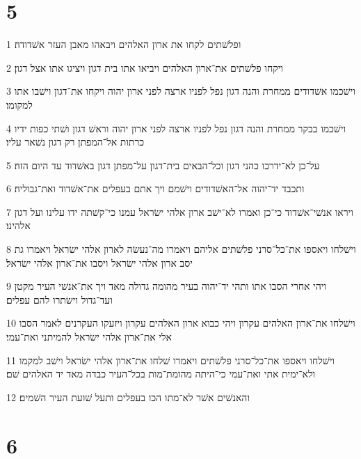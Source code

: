 \chapter{5}

\par 1 ופלשׁתים לקחו את ארון האלהים ויבאהו מאבן העזר אשׁדודה׃
\par 2 ויקחו פלשׁתים את־ארון האלהים ויביאו אתו בית דגון ויציגו אתו אצל דגון׃
\par 3 וישׁכמו אשׁדודים ממחרת והנה דגון נפל לפניו ארצה לפני ארון יהוה ויקחו את־דגון וישׁבו אתו למקומו׃
\par 4 וישׁכמו בבקר ממחרת והנה דגון נפל לפניו ארצה לפני ארון יהוה וראשׁ דגון ושׁתי כפות ידיו כרתות אל־המפתן רק דגון נשׁאר עליו׃
\par 5 על־כן לא־ידרכו כהני דגון וכל־הבאים בית־דגון על־מפתן דגון באשׁדוד עד היום הזה׃
\par 6 ותכבד יד־יהוה אל־האשׁדודים וישׁמם ויך אתם בעפלים את־אשׁדוד ואת־גבוליה׃
\par 7 ויראו אנשׁי־אשׁדוד כי־כן ואמרו לא־ישׁב ארון אלהי ישׂראל עמנו כי־קשׁתה ידו עלינו ועל דגון אלהינו׃
\par 8 וישׁלחו ויאספו את־כל־סרני פלשׁתים אליהם ויאמרו מה־נעשׂה לארון אלהי ישׂראל ויאמרו גת יסב ארון אלהי ישׂראל ויסבו את־ארון אלהי ישׂראל׃
\par 9 ויהי אחרי הסבו אתו ותהי יד־יהוה בעיר מהומה גדולה מאד ויך את־אנשׁי העיר מקטן ועד־גדול וישׂתרו להם עפלים׃
\par 10 וישׁלחו את־ארון האלהים עקרון ויהי כבוא ארון האלהים עקרון ויזעקו העקרנים לאמר הסבו אלי את־ארון אלהי ישׂראל להמיתני ואת־עמי׃
\par 11 וישׁלחו ויאספו את־כל־סרני פלשׁתים ויאמרו שׁלחו את־ארון אלהי ישׂראל וישׁב למקמו ולא־ימית אתי ואת־עמי כי־היתה מהומת־מות בכל־העיר כבדה מאד יד האלהים שׁם׃
\par 12 והאנשׁים אשׁר לא־מתו הכו בעפלים ותעל שׁועת העיר השׁמים׃

\chapter{6}


